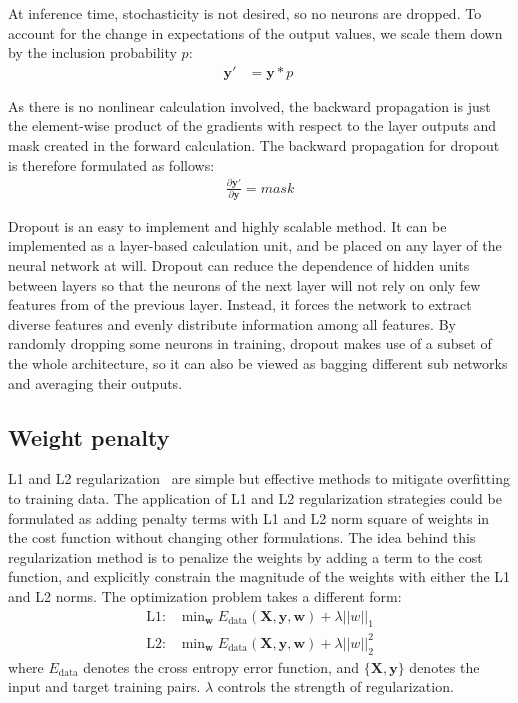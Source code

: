 \documentclass{article}
\begin{document}
At inference time, stochasticity is not desired, so no neurons are dropped. 
To account for the change in expectations of the output values, we scale them down by the inclusion probability $p$:
\begin{align}
    \bm{y}' &= \bm{y}*p\
\end{align}

As there is no nonlinear calculation involved, the backward propagation is just the element-wise product of the gradients with respect to the layer outputs and mask created in the forward calculation. 
The backward propagation for dropout is therefore formulated as follows:
\begin{align}
    \frac{\partial \bm{y}'}{\partial \bm{y}} = mask
\end{align}

Dropout is an easy to implement and highly scalable method. 
It can be implemented as a layer-based calculation unit, and be placed on any layer of the neural network at will. 
Dropout can reduce the dependence of hidden units between layers so that the neurons of the next layer will not rely on only few features from of the previous layer.
Instead, it forces the network to extract diverse features and evenly distribute information among all features. 
By randomly dropping some neurons in training, dropout makes use of a subset of the whole architecture, so it can also be viewed as bagging different sub networks and averaging their outputs.


\subsection{Weight penalty}

L1 and L2 regularization~\cite{ng2004feature} are simple but effective methods to mitigate overfitting to training data. 
The application of L1 and L2 regularization strategies could be formulated as adding penalty terms with L1 and L2 norm square of weights in the cost function without changing other formulations. 
The idea behind this regularization method is to penalize the weights by adding a term to the cost function, and explicitly constrain the magnitude of the weights with either the L1 and L2 norms.
The optimization problem takes a different form:
\begin{align}
    \text{L1: } & \text{min}_{\bm{w}} \; E_{\text{data}}(\bm{X}, \bm{y}, \bm{w}) + \lambda ||w||_1\\
    \text{L2: } & \text{min}_{\bm{w}} \; E_{\text{data}}(\bm{X}, \bm{y}, \bm{w}) + \lambda ||w||^2_2
\end{align}
where $E_{\text{data}}$ denotes the cross entropy error function, and $\{\bm{X}, \bm{y}\}$ denotes the input and target training pairs. 
$\lambda$ controls the strength of regularization.
\end{document}
